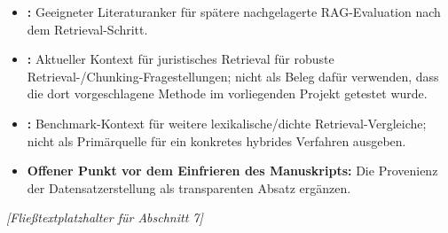 \documentclass[11pt]{article}
\begin{document}
\begin{quellenbox}
\begin{itemize}
    \item \textbf{\citet{lewis2020rag}:} Geeigneter Literaturanker f\"ur sp\"atere nachgelagerte RAG-Evaluation nach dem Retrieval-Schritt.
    \item \textbf{\citet{reuter-etal-2025-towards}:} Aktueller Kontext für juristisches Retrieval f\"ur robuste Retrieval-/Chunking-Fragestellungen; nicht als Beleg daf\"ur verwenden, dass die dort vorgeschlagene Methode im vorliegenden Projekt getestet wurde.
    \item \textbf{\citet{thakur2021beir}:} Benchmark-Kontext f\"ur weitere lexikalische/dichte Retrieval-Vergleiche; nicht als Prim\"arquelle f\"ur ein konkretes hybrides Verfahren ausgeben.
\end{itemize}
\end{quellenbox}

\begin{faktenbox}
\begin{itemize}
    \item \textbf{Offener Punkt vor dem Einfrieren des Manuskripts:} Die Provenienz der Datensatzerstellung als transparenten Absatz ergänzen.
\end{itemize}
\end{faktenbox}

\textit{[Fließtextplatzhalter für Abschnitt 7]}


\end{document}
